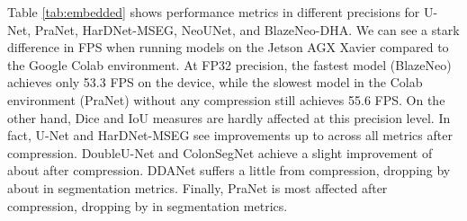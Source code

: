 \documentclass{ieeeaccess}
\newcommand{\ModelName}{BlazeNeo\xspace}
\newcommand{\DHA}{BlazeNeo-DHA\xspace}
\begin{document}
Table \ref{tab:embedded} shows performance metrics in different precisions for U-Net, PraNet, HarDNet-MSEG, NeoUNet, and \DHA. We can see a stark difference in FPS when running models on the Jetson AGX Xavier compared to the Google Colab environment. At FP32 precision, the fastest model (\ModelName) achieves only 53.3 FPS on the device, while the slowest model in the Colab environment (PraNet) without any compression still achieves 55.6 FPS. On the other hand, Dice and IoU measures are hardly affected at this precision level. In fact, U-Net and HarDNet-MSEG see improvements up to  across all metrics after compression. DoubleU-Net and ColonSegNet achieve a slight improvement of about  after compression. DDANet suffers a little from compression, dropping by about  in segmentation metrics. Finally, PraNet is most affected after compression, dropping by  in segmentation metrics.
\end{document}
